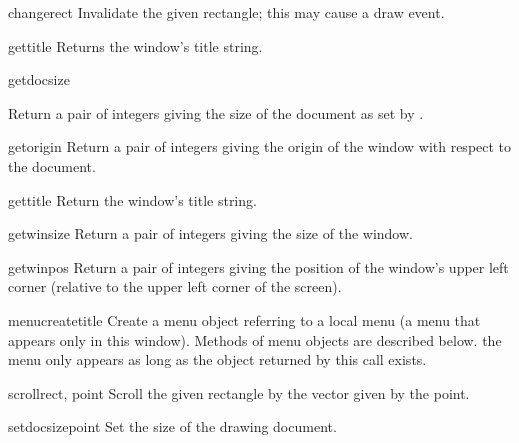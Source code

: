 \begin{funcdesc}{change}{rect}
Invalidate the given rectangle; this may cause a draw event.
\end{funcdesc}

\begin{funcdesc}{gettitle}{}
Returns the window's title string.
\end{funcdesc}

\begin{funcdesc}{getdocsize}{}
\begin{sloppypar}
Return a pair of integers giving the size of the document as set by
.
\end{sloppypar}
\end{funcdesc}

\begin{funcdesc}{getorigin}{}
Return a pair of integers giving the origin of the window with respect
to the document.
\end{funcdesc}

\begin{funcdesc}{gettitle}{}
Return the window's title string.
\end{funcdesc}

\begin{funcdesc}{getwinsize}{}
Return a pair of integers giving the size of the window.
\end{funcdesc}

\begin{funcdesc}{getwinpos}{}
Return a pair of integers giving the position of the window's upper
left corner (relative to the upper left corner of the screen).
\end{funcdesc}

\begin{funcdesc}{menucreate}{title}
Create a menu object referring to a local menu (a menu that appears
only in this window).
Methods of menu objects are described below.
 the menu only appears as long as the object
returned by this call exists.
\end{funcdesc}

\begin{funcdesc}{scroll}{rect, point}
Scroll the given rectangle by the vector given by the point.
\end{funcdesc}

\begin{funcdesc}{setdocsize}{point}
Set the size of the drawing document.
\end{funcdesc}

